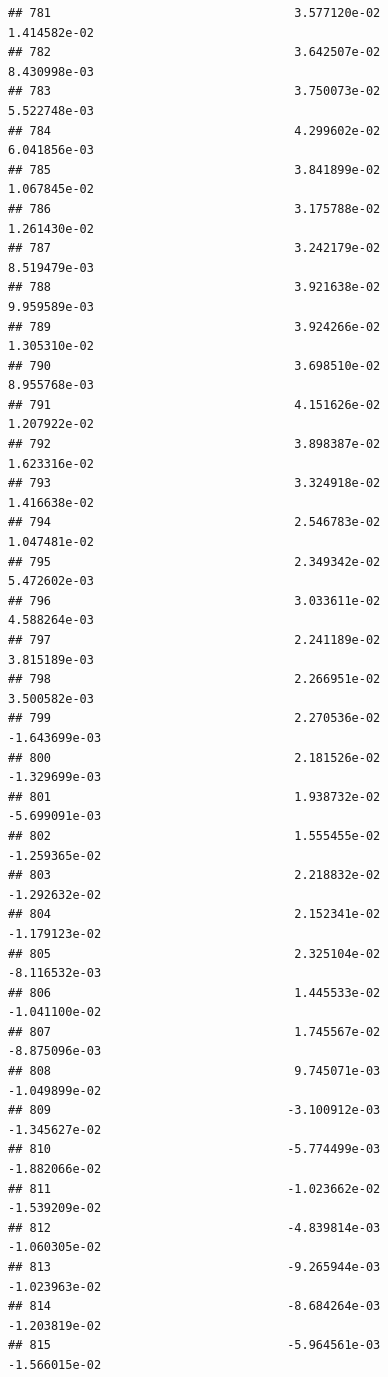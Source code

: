 \documentclass[
]{article}
\begin{document}
\begin{verbatim}
## 781                                  3.577120e-02           1.414582e-02
## 782                                  3.642507e-02           8.430998e-03
## 783                                  3.750073e-02           5.522748e-03
## 784                                  4.299602e-02           6.041856e-03
## 785                                  3.841899e-02           1.067845e-02
## 786                                  3.175788e-02           1.261430e-02
## 787                                  3.242179e-02           8.519479e-03
## 788                                  3.921638e-02           9.959589e-03
## 789                                  3.924266e-02           1.305310e-02
## 790                                  3.698510e-02           8.955768e-03
## 791                                  4.151626e-02           1.207922e-02
## 792                                  3.898387e-02           1.623316e-02
## 793                                  3.324918e-02           1.416638e-02
## 794                                  2.546783e-02           1.047481e-02
## 795                                  2.349342e-02           5.472602e-03
## 796                                  3.033611e-02           4.588264e-03
## 797                                  2.241189e-02           3.815189e-03
## 798                                  2.266951e-02           3.500582e-03
## 799                                  2.270536e-02          -1.643699e-03
## 800                                  2.181526e-02          -1.329699e-03
## 801                                  1.938732e-02          -5.699091e-03
## 802                                  1.555455e-02          -1.259365e-02
## 803                                  2.218832e-02          -1.292632e-02
## 804                                  2.152341e-02          -1.179123e-02
## 805                                  2.325104e-02          -8.116532e-03
## 806                                  1.445533e-02          -1.041100e-02
## 807                                  1.745567e-02          -8.875096e-03
## 808                                  9.745071e-03          -1.049899e-02
## 809                                 -3.100912e-03          -1.345627e-02
## 810                                 -5.774499e-03          -1.882066e-02
## 811                                 -1.023662e-02          -1.539209e-02
## 812                                 -4.839814e-03          -1.060305e-02
## 813                                 -9.265944e-03          -1.023963e-02
## 814                                 -8.684264e-03          -1.203819e-02
## 815                                 -5.964561e-03          -1.566015e-02

\end{verbatim}
\end{document}
